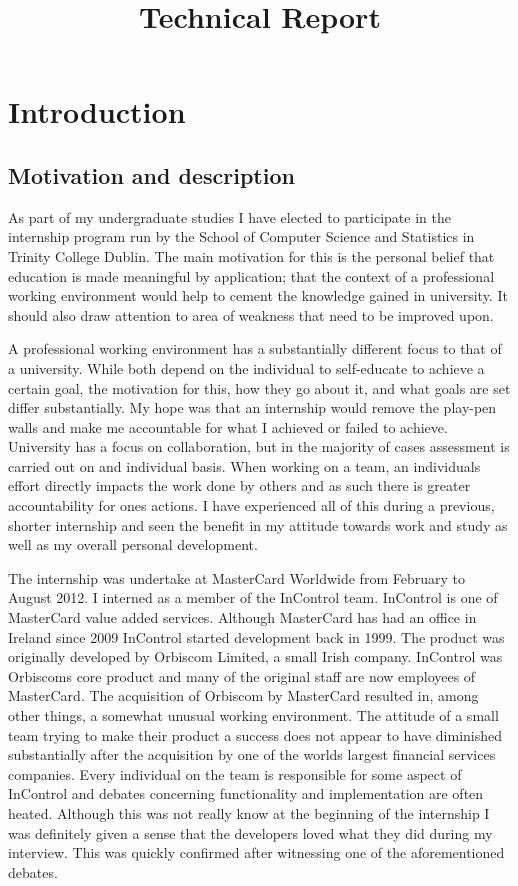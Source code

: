 \documentclass[a4paper, 11pt, titlepage]{article}
\title{Technical Report}
\begin{document}
\onehalfspacing
\maketitle

\tableofcontents


 
\section{Introduction} 
 
\subsection{Motivation and description} 
 
As part of my undergraduate studies I have elected to participate in the internship program run by the School of Computer Science and Statistics in Trinity College Dublin. The main motivation for this is the personal belief that education is made meaningful by application; that the context of a professional working environment would help to cement the knowledge gained in university. It should also draw attention to area of weakness that need to be improved upon.

A professional working environment has a substantially different focus to that of a university. While both depend on the individual to self-educate to achieve a certain goal, the motivation for this, how they go about it, and what goals are set differ substantially. My hope was that an internship would remove the play-pen walls and make me accountable for what I achieved or failed to achieve. University has a focus on collaboration, but in the majority of cases assessment is carried out on and individual basis. When working on a team, an individuals effort directly impacts the work done by others and as such there is greater accountability for ones actions. I have experienced all of this during a previous, shorter internship and seen the benefit in my attitude towards work and study as well as my overall personal development. 
 
The internship was undertake at MasterCard Worldwide from February to August 2012. I interned as a member of the InControl team. InControl is one of MasterCard value added services. Although MasterCard has had an office in Ireland since 2009 InControl started development back in 1999. The product was originally developed by Orbiscom Limited, a small Irish company. InControl was Orbiscoms core product and many of the original staff are now employees of MasterCard. The acquisition of Orbiscom by MasterCard resulted in, among other things, a somewhat unusual working environment. The attitude of a small team trying to make their product a success does not appear to have diminished substantially after the acquisition by one of the worlds largest financial services companies. Every individual on the team is responsible for some aspect of InControl and debates concerning functionality and implementation are often heated. Although this was not really know at the beginning of the internship I was definitely given a sense that the developers loved what they did during my interview. This was quickly confirmed after witnessing one of the aforementioned debates. 
\end{document}
